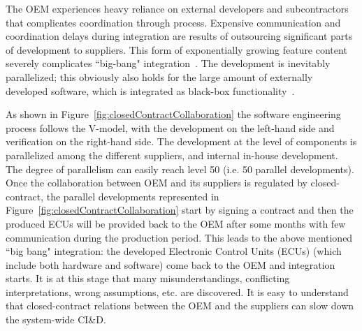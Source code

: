 The OEM experiences heavy reliance on external developers and subcontractors that complicates coordination through process. Expensive communication and coordination delays during integration are results of outsourcing significant parts of development to suppliers. This form of exponentially growing feature content severely complicates ``big-bang" integration~\cite{Eklund2012}. The development is inevitably parallelized; this obviously also holds for the large amount of externally developed software, which is integrated as black-box functionality~\cite{Patrizio2016AAF_Chalmers,Broy2009AAF_TUM,Broy:2006:CAS:1134285.1134292}. 

As shown in Figure~\ref{fig:closedContractCollaboration} the software engineering process follows the V-model, with the development on the left-hand side and verification on the right-hand side. The development at the level of components is parallelized among the different suppliers, and internal in-house development. The degree of parallelism can easily reach level 50 (i.e. 50 parallel developments). Once the collaboration between OEM and its suppliers is regulated by closed-contract, the parallel developments represented in Figure~\ref{fig:closedContractCollaboration} start by signing a contract and then the produced ECUs will be provided back to the OEM after some months with few communication during the production period.
This leads to the above mentioned ``big bang" integration: the developed Electronic Control Units (ECUs) (which include both hardware and software) come back to the OEM and integration starts. It is at this stage that many misunderstandings, conflicting interpretations, wrong assumptions, etc. are discovered.
It is easy to understand that closed-contract relations between the OEM and the suppliers can slow down the system-wide CI\&D.  %

